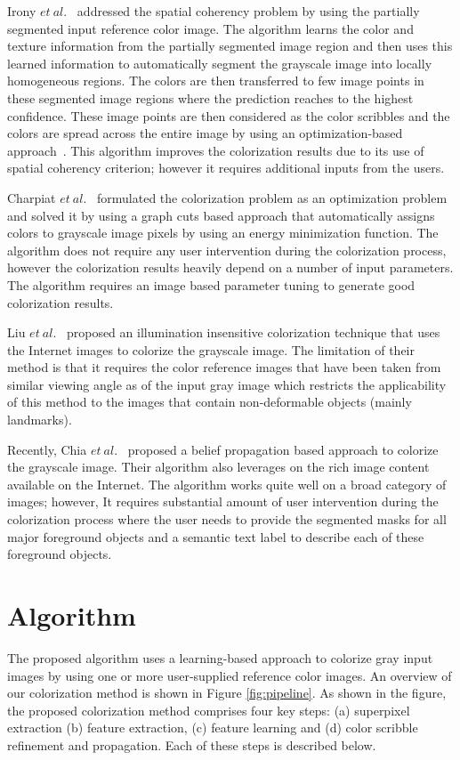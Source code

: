 \documentclass[twocolumn]{svjour3}          %
\begin{document}
Irony $et\ al.$~\cite{Irony05} addressed the spatial coherency problem by using the partially segmented input reference color image. The algorithm learns the color and texture information from the partially segmented image region and then uses this learned information to automatically segment the grayscale image into locally homogeneous regions. The colors are then transferred to few image points in these segmented image regions where the prediction reaches to the highest confidence. These image points are then considered as the color scribbles and the colors are spread across the entire image by using an optimization-based approach~\cite{Levin04}. This algorithm improves the colorization results due to its use of spatial coherency criterion; however it requires additional inputs from the users.

Charpiat $et\ al.$~\cite{Charpiat08} formulated the colorization problem as an optimization problem and solved it by using a graph cuts based approach that automatically assigns colors to grayscale image pixels by using an energy minimization function. The algorithm does not require any user intervention during the colorization process, however the colorization results heavily depend on a number of input parameters. The algorithm requires an image based parameter tuning to generate good colorization results.

Liu $et\ al.$~\cite{Liu08} proposed an illumination insensitive colorization technique that uses the Internet images to colorize the grayscale image. The limitation of their method is that it requires the color reference images that have been taken from similar viewing angle as of the input gray image which restricts the applicability of this method to the images that contain non-deformable objects (mainly landmarks).

Recently, Chia $et\ al.$~\cite{Alex11} proposed a belief propagation based approach to colorize the grayscale image. Their algorithm also leverages on the rich image content available on the Internet. The algorithm works quite well on a broad category of images; however, It requires substantial amount of user intervention during the colorization process where the user needs to provide the segmented masks for all major foreground objects and a semantic text label to describe each of these foreground objects.


\section{Algorithm}
\label{sec:3}
The proposed algorithm uses a learning-based approach to colorize gray input images by using one or more user-supplied reference color images. An overview of our colorization method is shown in Figure \ref{fig:pipeline}. As shown in the figure, the proposed colorization method comprises four key steps: (a) superpixel extraction (b) feature extraction, (c) feature learning and (d) color scribble refinement and propagation. Each of these steps is described below.
\end{document}

